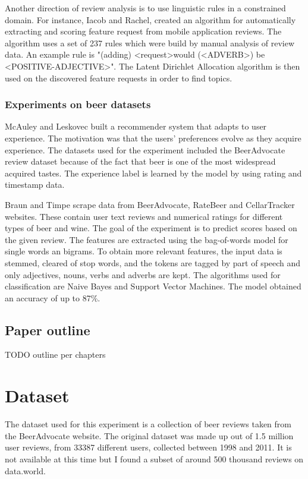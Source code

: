 \documentclass[12pt]{article}
\begin{document}
	Another direction of review analysis is to use linguistic rules in a constrained domain. For instance, Iacob and Rachel\cite{MARA}, created an algorithm for automatically extracting and scoring feature request from mobile application reviews. The algorithm uses a set of 237 rules which were build by manual analysis of review data. An example rule is "(adding) \textless request\textgreater would (\textless ADVERB\textgreater) be \textless POSITIVE-ADJECTIVE\textgreater". The Latent Dirichlet Allocation algorithm is then used on the discovered feature requests in order to find topics.
	
	\subsubsection{Experiments on beer datasets}
	McAuley and Leskovec\cite{ExperienceReview} built a recommender system that adapts to user experience. The motivation was that the users' preferences evolve as they acquire experience. The datasets used for the experiment included the BeerAdvocate review dataset\cite{BeerAdvocateData} because of the fact that beer is one of the most widespread acquired tastes. The experience label is learned by the model by using rating and timestamp data.
	
	Braun and Timpe\cite{BeerWineReviews} scrape data from BeerAdvocate, RateBeer and CellarTracker websites. These contain user text reviews and numerical ratings for different types of beer and wine. The goal of the experiment is to predict scores based on the given review. The features are extracted using the bag-of-words model for single words an bigrams. To obtain more relevant features, the input data is stemmed, cleared of stop words, and the tokens are tagged by part of speech and only adjectives, nouns, verbs and adverbs are kept. The algorithms used for classification are Naive Bayes and Support Vector Machines. The model obtained an accuracy of up to 87\%.
	
	\subsection{Paper outline}
	TODO outline per chapters
	
	\section{Dataset}
	The dataset used for this experiment is a collection of beer reviews taken from the BeerAdvocate website. The original dataset was made up out of 1.5 million user reviews, from 33387 different users, collected between 1998 and 2011. It is not available at this time but I found a subset of around 500 thousand reviews on data.world\cite{BeerAdvocateData}. 
	
\end{document}

